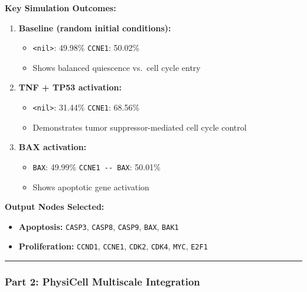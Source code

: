 \textbf{Key Simulation Outcomes:}

\begin{enumerate}
\def\labelenumi{\arabic{enumi}.}
\tightlist
\item
  \textbf{Baseline (random initial conditions):}

  \begin{itemize}
  \tightlist
  \item
    \texttt{\textless{}nil\textgreater{}}: 49.98\% \textbar{}
    \texttt{CCNE1}: 50.02\%
  \item
    Shows balanced quiescence vs.~cell cycle entry
  \end{itemize}
\item
  \textbf{TNF + TP53 activation:}

  \begin{itemize}
  \tightlist
  \item
    \texttt{\textless{}nil\textgreater{}}: 31.44\% \textbar{}
    \texttt{CCNE1}: 68.56\%
  \item
    Demonstrates tumor suppressor-mediated cell cycle control
  \end{itemize}
\item
  \textbf{BAX activation:}

  \begin{itemize}
  \tightlist
  \item
    \texttt{BAX}: 49.99\% \textbar{} \texttt{CCNE1\ -\/-\ BAX}: 50.01\%
  \item
    Shows apoptotic gene activation
  \end{itemize}
\end{enumerate}

\textbf{Output Nodes Selected:}

\begin{itemize}
\tightlist
\item
  \textbf{Apoptosis:} \texttt{CASP3}, \texttt{CASP8}, \texttt{CASP9},
  \texttt{BAX}, \texttt{BAK1}
\item
  \textbf{Proliferation:} \texttt{CCND1}, \texttt{CCNE1}, \texttt{CDK2},
  \texttt{CDK4}, \texttt{MYC}, \texttt{E2F1}
\end{itemize}

\begin{center}\rule{0.5\linewidth}{0.5pt}\end{center}

\hypertarget{part-2-physicell-multiscale-integration}{%
\subsubsection{Part 2: PhysiCell Multiscale
Integration}\label{part-2-physicell-multiscale-integration}}

